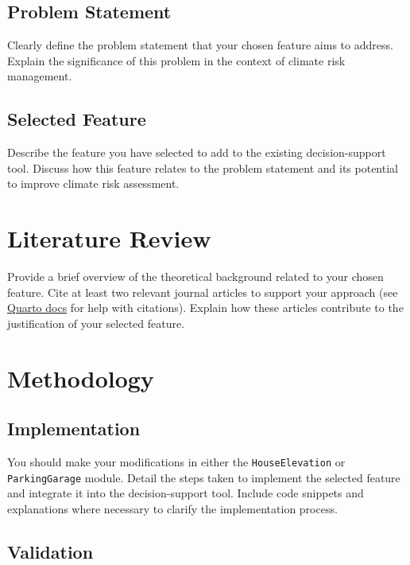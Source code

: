 \documentclass[
  11pt,
]{article}
\begin{document}
\subsection{Problem Statement}\label{problem-statement}

Clearly define the problem statement that your chosen feature aims to
address. Explain the significance of this problem in the context of
climate risk management.

\subsection{Selected Feature}\label{selected-feature}

Describe the feature you have selected to add to the existing
decision-support tool. Discuss how this feature relates to the problem
statement and its potential to improve climate risk assessment.

\section{Literature Review}\label{literature-review}

Provide a brief overview of the theoretical background related to your
chosen feature. Cite at least two relevant journal articles to support
your approach (see
\href{https://quarto.org/docs/authoring/footnotes-and-citations.html}{Quarto
docs} for help with citations). Explain how these articles contribute to
the justification of your selected feature.

\section{Methodology}\label{methodology}

\subsection{Implementation}\label{implementation}

You should make your modifications in either the \texttt{HouseElevation}
or \texttt{ParkingGarage} module. Detail the steps taken to implement
the selected feature and integrate it into the decision-support tool.
Include code snippets and explanations where necessary to clarify the
implementation process.

\subsection{Validation}\label{validation}
\end{document}
